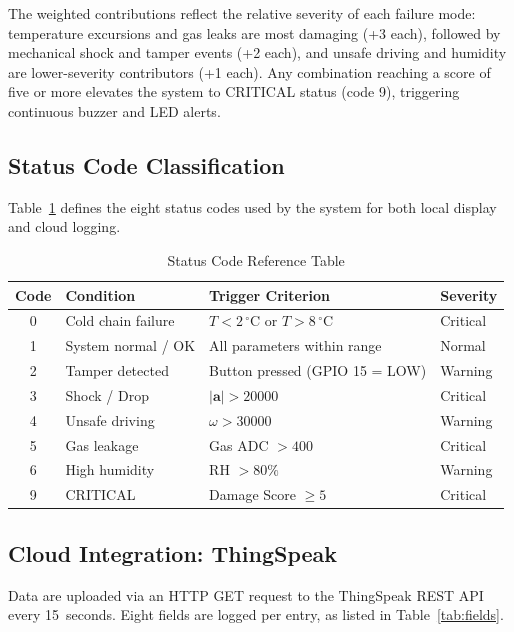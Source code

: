 \documentclass[12pt, a4paper]{article}
\begin{document}
The weighted contributions reflect the relative severity of each failure mode: temperature excursions and gas leaks are most damaging (+3 each), followed by mechanical shock and tamper events (+2 each), and unsafe driving and humidity are lower-severity contributors (+1 each). Any combination reaching a score of five or more elevates the system to CRITICAL status (code 9), triggering continuous buzzer and LED alerts.

\subsection{Status Code Classification}

Table~\ref{tab:statuscodes} defines the eight status codes used by the system for both local display and cloud logging.

\begin{table}[H]
\centering
\caption{Status Code Reference Table}
\label{tab:statuscodes}
\renewcommand{\arraystretch}{1.3}
\begin{tabular}{clll}
\toprule
\textbf{Code} & \textbf{Condition} & \textbf{Trigger Criterion} & \textbf{Severity} \\
\midrule
0 & Cold chain failure   & $T < 2\,^\circ\text{C}$ or $T > 8\,^\circ\text{C}$ & Critical \\
1 & System normal / OK  & All parameters within range   & Normal \\
2 & Tamper detected      & Button pressed (GPIO 15 = LOW) & Warning \\
3 & Shock / Drop         & $|\mathbf{a}| > 20000$         & Critical \\
4 & Unsafe driving       & $\omega > 30000$               & Warning \\
5 & Gas leakage          & Gas ADC $> 400$                & Critical \\
6 & High humidity        & RH $> 80\%$                    & Warning \\
9 & CRITICAL             & Damage Score $\geq 5$          & Critical \\
\bottomrule
\end{tabular}
\end{table}

\subsection{Cloud Integration: ThingSpeak}

Data are uploaded via an HTTP GET request to the ThingSpeak REST API every 15~seconds. Eight fields are logged per entry, as listed in Table~\ref{tab:fields}.
\end{document}
